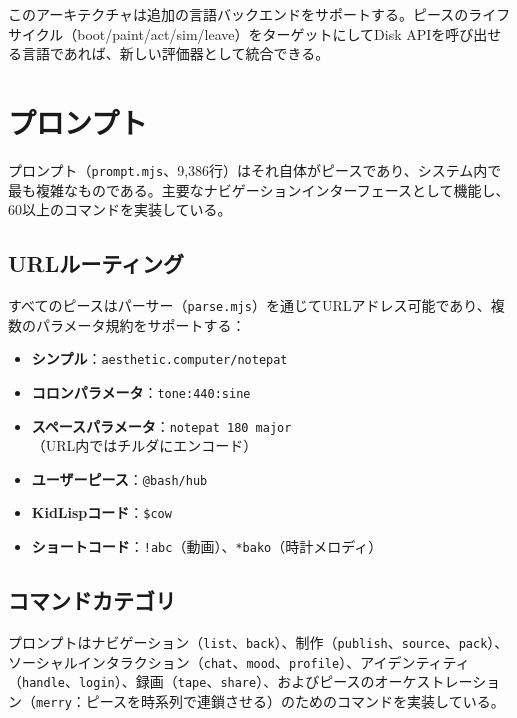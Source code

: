 \documentclass[10pt,letterpaper,twocolumn]{article}
\begin{document}
このアーキテクチャは追加の言語バックエンドをサポートする。ピースのライフサイクル（boot/paint/act/sim/leave）をターゲットにしてDisk APIを呼び出せる言語であれば、新しい評価器として統合できる。


\section{プロンプト}
\label{sec:prompt}

プロンプト（\texttt{prompt.mjs}、9,386行）はそれ自体がピースであり、システム内で最も複雑なものである。主要なナビゲーションインターフェースとして機能し、60以上のコマンドを実装している。

\subsection{URLルーティング}

すべてのピースはパーサー（\texttt{parse.mjs}）を通じてURLアドレス可能であり、複数のパラメータ規約をサポートする：

\begin{itemize}
  \item \textbf{シンプル}：\texttt{aesthetic.computer/notepat}
  \item \textbf{コロンパラメータ}：\texttt{tone:440:sine}
  \item \textbf{スペースパラメータ}：\texttt{notepat 180 major}（URL内ではチルダにエンコード）
  \item \textbf{ユーザーピース}：\texttt{@bash/hub}
  \item \textbf{KidLispコード}：\texttt{\$cow}
  \item \textbf{ショートコード}：\texttt{!abc}（動画）、\texttt{*bako}（時計メロディ）
\end{itemize}

\subsection{コマンドカテゴリ}

プロンプトはナビゲーション（\texttt{list}、\texttt{back}）、制作（\texttt{publish}、\texttt{source}、\texttt{pack}）、ソーシャルインタラクション（\texttt{chat}、\texttt{mood}、\texttt{profile}）、アイデンティティ（\texttt{handle}、\texttt{login}）、録画（\texttt{tape}、\texttt{share}）、およびピースのオーケストレーション（\texttt{merry}：ピースを時系列で連鎖させる）のためのコマンドを実装している。
\end{document}
